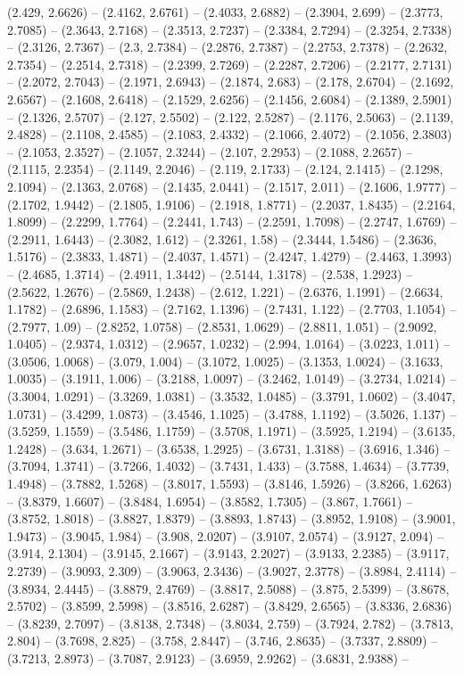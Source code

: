 (2.429, 2.6626) -- (2.4162, 2.6761) -- (2.4033, 2.6882) -- (2.3904, 2.699) -- (2.3773, 2.7085) -- (2.3643, 2.7168) -- (2.3513, 2.7237) -- (2.3384, 2.7294) -- (2.3254, 2.7338) -- (2.3126, 2.7367) -- (2.3, 2.7384) -- (2.2876, 2.7387) -- (2.2753, 2.7378) -- (2.2632, 2.7354) -- (2.2514, 2.7318) -- (2.2399, 2.7269) -- (2.2287, 2.7206) -- (2.2177, 2.7131) -- (2.2072, 2.7043) -- (2.1971, 2.6943) -- (2.1874, 2.683) -- (2.178, 2.6704) -- (2.1692, 2.6567) -- (2.1608, 2.6418) -- (2.1529, 2.6256) -- (2.1456, 2.6084) -- (2.1389, 2.5901) -- (2.1326, 2.5707) -- (2.127, 2.5502) -- (2.122, 2.5287) -- (2.1176, 2.5063) -- (2.1139, 2.4828) -- (2.1108, 2.4585) -- (2.1083, 2.4332) -- (2.1066, 2.4072) -- (2.1056, 2.3803) -- (2.1053, 2.3527) -- (2.1057, 2.3244) -- (2.107, 2.2953) -- (2.1088, 2.2657) -- (2.1115, 2.2354) -- (2.1149, 2.2046) -- (2.119, 2.1733) -- (2.124, 2.1415) -- (2.1298, 2.1094) -- (2.1363, 2.0768) -- (2.1435, 2.0441) -- (2.1517, 2.011) -- (2.1606, 1.9777) -- (2.1702, 1.9442) -- (2.1805, 1.9106) -- (2.1918, 1.8771) -- (2.2037, 1.8435) -- (2.2164, 1.8099) -- (2.2299, 1.7764) -- (2.2441, 1.743) -- (2.2591, 1.7098) -- (2.2747, 1.6769) -- (2.2911, 1.6443) -- (2.3082, 1.612) -- (2.3261, 1.58) -- (2.3444, 1.5486) -- (2.3636, 1.5176) -- (2.3833, 1.4871) -- (2.4037, 1.4571) -- (2.4247, 1.4279) -- (2.4463, 1.3993) -- (2.4685, 1.3714) -- (2.4911, 1.3442) -- (2.5144, 1.3178) -- (2.538, 1.2923) -- (2.5622, 1.2676) -- (2.5869, 1.2438) -- (2.612, 1.221) -- (2.6376, 1.1991) -- (2.6634, 1.1782) -- (2.6896, 1.1583) -- (2.7162, 1.1396) -- (2.7431, 1.122) -- (2.7703, 1.1054) -- (2.7977, 1.09) -- (2.8252, 1.0758) -- (2.8531, 1.0629) -- (2.8811, 1.051) -- (2.9092, 1.0405) -- (2.9374, 1.0312) -- (2.9657, 1.0232) -- (2.994, 1.0164) -- (3.0223, 1.011) -- (3.0506, 1.0068) -- (3.079, 1.004) -- (3.1072, 1.0025) -- (3.1353, 1.0024) -- (3.1633, 1.0035) -- (3.1911, 1.006) -- (3.2188, 1.0097) -- (3.2462, 1.0149) -- (3.2734, 1.0214) -- (3.3004, 1.0291) -- (3.3269, 1.0381) -- (3.3532, 1.0485) -- (3.3791, 1.0602) -- (3.4047, 1.0731) -- (3.4299, 1.0873) -- (3.4546, 1.1025) -- (3.4788, 1.1192) -- (3.5026, 1.137) -- (3.5259, 1.1559) -- (3.5486, 1.1759) -- (3.5708, 1.1971) -- (3.5925, 1.2194) -- (3.6135, 1.2428) -- (3.634, 1.2671) -- (3.6538, 1.2925) -- (3.6731, 1.3188) -- (3.6916, 1.346) -- (3.7094, 1.3741) -- (3.7266, 1.4032) -- (3.7431, 1.433) -- (3.7588, 1.4634) -- (3.7739, 1.4948) -- (3.7882, 1.5268) -- (3.8017, 1.5593) -- (3.8146, 1.5926) -- (3.8266, 1.6263) -- (3.8379, 1.6607) -- (3.8484, 1.6954) -- (3.8582, 1.7305) -- (3.867, 1.7661) -- (3.8752, 1.8018) -- (3.8827, 1.8379) -- (3.8893, 1.8743) -- (3.8952, 1.9108) -- (3.9001, 1.9473) -- (3.9045, 1.984) -- (3.908, 2.0207) -- (3.9107, 2.0574) -- (3.9127, 2.094) -- (3.914, 2.1304) -- (3.9145, 2.1667) -- (3.9143, 2.2027) -- (3.9133, 2.2385) -- (3.9117, 2.2739) -- (3.9093, 2.309) -- (3.9063, 2.3436) -- (3.9027, 2.3778) -- (3.8984, 2.4114) -- (3.8934, 2.4445) -- (3.8879, 2.4769) -- (3.8817, 2.5088) -- (3.875, 2.5399) -- (3.8678, 2.5702) -- (3.8599, 2.5998) -- (3.8516, 2.6287) -- (3.8429, 2.6565) -- (3.8336, 2.6836) -- (3.8239, 2.7097) -- (3.8138, 2.7348) -- (3.8034, 2.759) -- (3.7924, 2.782) -- (3.7813, 2.804) -- (3.7698, 2.825) -- (3.758, 2.8447) -- (3.746, 2.8635) -- (3.7337, 2.8809) -- (3.7213, 2.8973) -- (3.7087, 2.9123) -- (3.6959, 2.9262) -- (3.6831, 2.9388) -- 